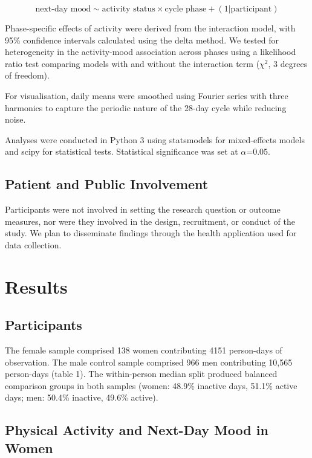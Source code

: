 \documentclass[12pt]{article}
\begin{document}
\begin{equation*}
\text{next-day mood} \sim \text{activity status} \times \text{cycle phase} + (1|\text{participant})
\end{equation*}

Phase-specific effects of activity were derived from the interaction model, with 95\% confidence intervals calculated using the delta method. We tested for heterogeneity in the activity-mood association across phases using a likelihood ratio test comparing models with and without the interaction term ($\chi^2$, 3 degrees of freedom).

For visualisation, daily means were smoothed using Fourier series with three harmonics to capture the periodic nature of the 28-day cycle while reducing noise.

Analyses were conducted in Python 3 using statsmodels for mixed-effects models and scipy for statistical tests. Statistical significance was set at $\alpha$=0.05.

\subsection*{Patient and Public Involvement}

Participants were not involved in setting the research question or outcome measures, nor were they involved in the design, recruitment, or conduct of the study. We plan to disseminate findings through the health application used for data collection.

\section*{Results}

\subsection*{Participants}

The female sample comprised 138 women contributing 4151 person-days of observation. The male control sample comprised 966 men contributing 10,565 person-days (table 1). The within-person median split produced balanced comparison groups in both samples (women: 48.9\% inactive days, 51.1\% active days; men: 50.4\% inactive, 49.6\% active).

\subsection*{Physical Activity and Next-Day Mood in Women}
\end{document}
